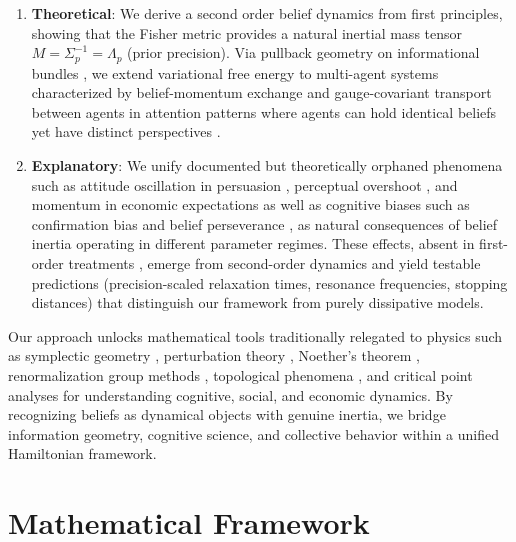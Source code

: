 \documentclass[12pt]{article}
\begin{document}
\begin{enumerate}

\item \textbf{Theoretical}: We derive a second order belief dynamics from first principles, showing that the Fisher metric provides a natural inertial mass tensor $M = \Sigma_p^{-1} = \Lambda_p$ (prior precision). Via pullback geometry on informational bundles \citet{Amari2016,nielsen2020elementary}, we extend variational free energy to multi-agent systems characterized by belief-momentum exchange and gauge-covariant transport between agents in attention patterns where agents can hold identical beliefs yet have distinct perspectives\citet{Vaswani2017} \citet{Dennis2025}\citet{kobayashi1963foundations}.

\item \textbf{Explanatory}: We unify documented but theoretically orphaned phenomena such as attitude oscillation in persuasion \citet{kaplowitz1992,fink2002}, perceptual overshoot \citet{burge2010,webster2015}, and momentum in economic expectations \citet{coibion2015} as well as cognitive biases such as confirmation bias \citet{nickerson1998confirmation} and belief perseverance \citet{anderson1980perseverance}, as natural consequences of belief inertia operating in different parameter regimes. These effects, absent in first-order treatments \citet{parr2022active}, emerge from second-order dynamics and yield testable predictions (precision-scaled relaxation times, resonance frequencies, stopping distances) that distinguish our framework from purely dissipative models.

\end{enumerate}

Our approach unlocks mathematical tools traditionally relegated to physics such as symplectic geometry \citet{arnold1989mathematical}, perturbation theory \citet{holmes2012introduction}, Noether's theorem \citet{olver1993applications}, renormalization group methods \citet{wilson1975renormalization,goldenfeld1992lectures}, topological phenomena \citet{nakahara2003geometry,bernevig2013topological}, and critical point analyses \citet{strogatz2015nonlinear,sornette2006critical} for understanding cognitive, social, and economic dynamics. By recognizing beliefs as dynamical objects with genuine inertia, we bridge information geometry, cognitive science, and collective behavior within a unified Hamiltonian framework.

\section{Mathematical Framework}
\end{document}
